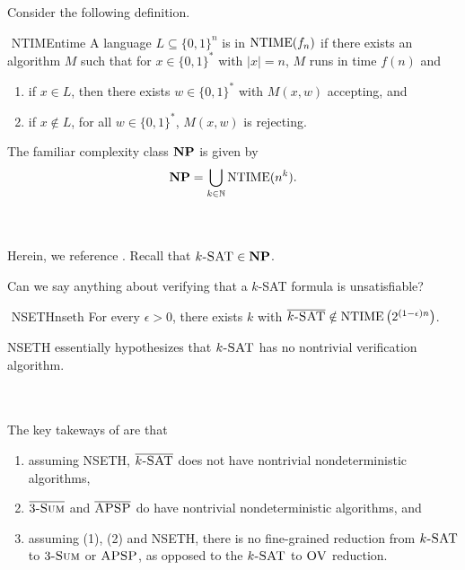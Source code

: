         Consider the following definition.
        \begin{definition}{\Stop\,\,NTIME}{ntime}
            A language \(L\subseteq\{0,1\}^n\) is in \(\NTIME(f_n)\) if there exists an algorithm \(M\) such that for \(x\in\{0,1\}^*\) with \(|x|=n\), \(M\) runs in time \(f(n)\) and
            \begin{enumerate}
                \item if \(x\in L\), then there exists \(w\in\{0,1\}^*\) with \(M(x,w)\) accepting, and
                \item if \(x\nin L\), for all \(w\in\{0,1\}^*\), \(M(x,w)\) is rejecting.
            \end{enumerate}
        \end{definition}
        \begin{remark*}
            The familiar complexity class \(\com{NP}\) is given by
            \begin{equation*}
                \com{NP}=\bigcup_{k\in\mathbb{N}}\NTIME(n^k).
            \end{equation*}
        \end{remark*}
        \vphantom
        \\
        \\
        Herein, we reference \cite{carmosino2016nseth}. Recall that \(k\textsc{-SAT}\in\com{NP}\).
        \begin{question*}
            Can we say anything about verifying that a \(k\)\textsc{-SAT} formula is unsatisfiable?
        \end{question*}
        \begin{hypothesis}{\Stop\,\,NSETH}{nseth}
            For every \(\epsilon>0\), there exists \(k\) with \(\bar{k\textsc{-SAT}}\nin\NTIME\left(2^{(1-\epsilon)n}\right)\).
        \end{hypothesis}
        \begin{remark*}
            NSETH essentially hypothesizes that \(k\textsc{-SAT}\) has no nontrivial verification algorithm.
        \end{remark*} 
        \vphantom
        \\
        \\
        The key takeways of \cite{carmosino2016nseth} are that
        \begin{enumerate}
            \item assuming NSETH, \(\bar{k\textsc{-SAT}}\) does not have nontrivial nondeterministic algorithms,
            \item \(\bar{3\textsc{-Sum}}\) and \(\bar{\textsc{APSP}}\) do have nontrivial nondeterministic algorithms, and
            \item assuming (1), (2) and NSETH, there is no fine-grained reduction from \(k\textsc{-SAT}\) to \(3\textsc{-Sum}\) or \(\textsc{APSP}\), as opposed to the \(k\textsc{-SAT}\) to \(\textsc{OV}\) reduction.
        \end{enumerate}
        
